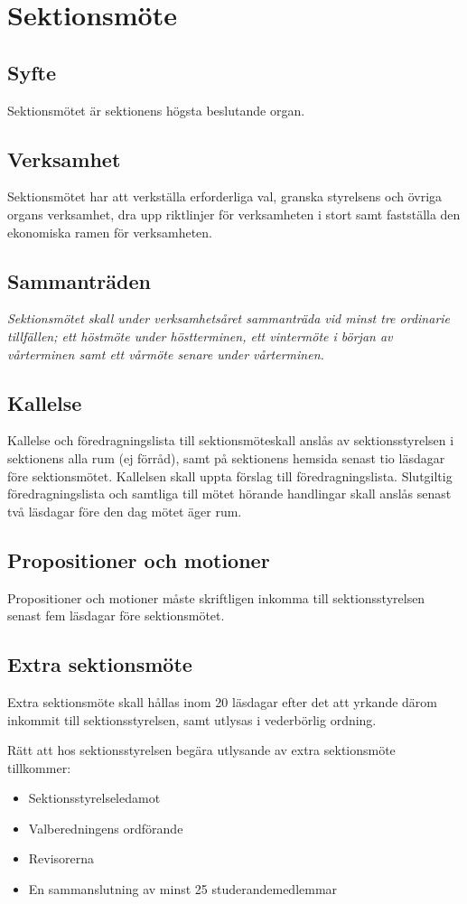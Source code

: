 \documentclass{datateknologsektionen-document}
\begin{document}
  \section{Sektionsmöte}
    \subsection{Syfte}
      Sektionsmötet är sektionens högsta beslutande organ.
    \subsection{Verksamhet}
      Sektionsmötet har att verkställa erforderliga val, granska styrelsens och övriga organs
      verksamhet, dra upp riktlinjer för verksamheten i stort samt fastställa den ekonomiska
      ramen för verksamheten.
    \subsection{Sammanträden}
      \textit{Sektionsmötet skall under verksamhetsåret sammanträda vid minst tre ordinarie tillfällen;
      ett höstmöte under höstterminen, ett vintermöte i början av vårterminen samt ett vårmöte
      senare under vårterminen.
      }
    \subsection{Kallelse}
      Kallelse och föredragningslista till sektionsmöteskall anslås av sektionsstyrelsen i
      sektionens alla rum (ej förråd), samt på sektionens hemsida senast tio läsdagar före
      sektionsmötet. Kallelsen skall uppta förslag till föredragningslista. Slutgiltig
      föredragningslista och samtliga till mötet hörande handlingar skall anslås senast två
      läsdagar före den dag mötet äger rum.
    \subsection{Propositioner och motioner}
      Propositioner och motioner måste skriftligen inkomma till sektionsstyrelsen senast fem
      läsdagar före sektionsmötet.
    \subsection{Extra sektionsmöte}
      Extra sektionsmöte skall hållas inom 20 läsdagar efter det att yrkande därom inkommit
      till sektionsstyrelsen, samt utlysas i vederbörlig ordning.

      Rätt att hos sektionsstyrelsen begära utlysande av extra sektionsmöte tillkommer:
      \begin{itemize}
        \item Sektionsstyrelseledamot
        \item Valberedningens ordförande
        \item Revisorerna
        \item En sammanslutning av minst 25 studerandemedlemmar
      \end{itemize}
      
\end{document}
